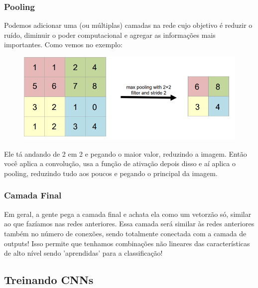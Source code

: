 \documentclass{article}
\begin{document}
\subsubsection{Pooling}
Podemos adicionar uma (ou múltiplas) camadas na rede cujo objetivo é reduzir o ruído, diminuir o poder computacional e agregar as informações mais importantes. Como vemos no exemplo:
\begin{figure}[h]
\includegraphics[scale = 0.5]{Pooling.PNG}

\end{figure}
Ele tá andando de 2 em 2 e pegando o maior valor, reduzindo a imagem. Então você aplica a convolução, usa a função de ativação depois disso e aí aplica o pooling, reduzindo tudo aos poucos e pegando o principal da imagem.

\subsubsection{Camada Final}
Em geral, a gente pega a camada final e achata ela como um vetorzão só, similar ao que fazíamos nas redes anteriores. Essa camada será similar às redes anteriores também no número de conexões, sendo totalmente conectada com a camada de outputs! Isso permite que tenhamos combinações não lineares das características de alto nível sendo 'aprendidas' para a classificação!

\subsection{Treinando CNNs}
\end{document}
